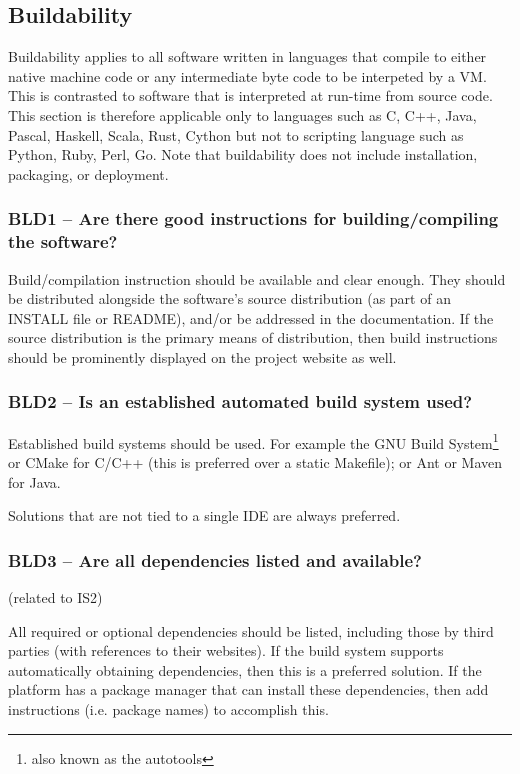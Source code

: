\documentclass[a4paper,11pt]{article}
\begin{document}
\subsection{Buildability}

Buildability applies to all software written in languages that compile to
either native machine code or any intermediate byte code to be interpeted by a VM.
This is contrasted to software that is interpreted at run-time from source
code. This section is therefore applicable only to languages such as C, C++,
Java, Pascal, Haskell, Scala, Rust, Cython but not to scripting language such
as Python, Ruby, Perl, Go.  Note that buildability does not include
installation, packaging, or deployment.

\subsubsection{BLD1 -- Are there good instructions for building/compiling the software?}

Build/compilation instruction should be available and clear enough. They should
be distributed alongside the software's source distribution (as part of an
INSTALL file or README), and/or be addressed in the documentation. If the
source distribution is the primary means of distribution, then build
instructions should be prominently displayed on the project website as well.

\subsubsection{BLD2 -- Is an established automated build system used?}

Established build systems should be used. For example the GNU Build
System\footnote{also known as the autotools} or CMake for C/C++ (this is
preferred over a static Makefile); or Ant or Maven for Java. 

Solutions that are not tied to a single IDE are always preferred.

\subsubsection{BLD3 -- Are all dependencies listed and available?}
(related to IS2)

All required or optional dependencies should be listed, including those by
third parties (with references to their websites). If the build system supports
automatically obtaining dependencies, then this is a preferred solution. If the
platform has a package manager that can install these dependencies, then add
instructions (i.e. package names) to accomplish this.
\end{document}
